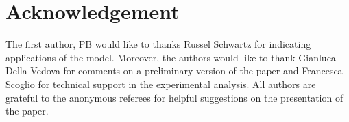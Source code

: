 \documentclass{llncs}
\begin{document}
\section{Acknowledgement}
The first author, PB would like to thanks Russel Schwartz for indicating applications of the model. Moreover, the authors would like to thank Gianluca Della Vedova for comments on a preliminary version of the paper and Francesca Scoglio for technical support in the experimental analysis.
All authors are grateful to the anonymous referees for helpful suggestions on the presentation of the paper.






 
\end{document}
